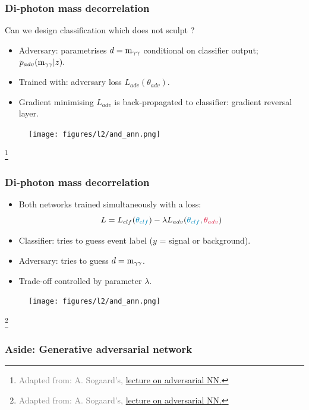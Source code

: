 \documentclass[11pt,xcolor=dvipsnames,aspectratio=169]{beamer}
\newcommand\blfootnote[1]{%
  \begingroup
  \renewcommand\thefootnote{}\footnote{\hspace{-30pt}\textcolor{Gray}{\tiny #1}}%
  \addtocounter{footnote}{-1}%
  \endgroup
}
\begin{document}
\begin{frame}
  \frametitle{\bf Di-photon mass decorrelation}
  Can we design classification which does not sculpt \myy{}?
  \begin{itemize}
  \item \textcolor{EDBRed}{Adversary}: parametrises $d=\mathrm{m}_{\gamma\gamma}{}$ conditional on classifier output; $p_{adv}(\mathrm{m}_{\gamma\gamma}{}|z).$
  \item Trained with: \textcolor{EDBRed}{adversary loss $L_{adv}(\theta_{adv})$}.
  \item Gradient minimising \textcolor{EDBRed}{$L_{adv}$} is back-propagated to
    \textcolor{EDBBlue}{classifier}: gradient reversal layer.
  \end{itemize}
  \begin{figure}
    \texttt{[image: figures/l2/and\_ann.png]}
  \end{figure}
  \blfootnote{Adapted from: A. Sogaard's,
    \href{https://github.com/asogaard/ep2mlf/blob/master/01-adversarial/2018-11-13_EP2MLF_AndreasSogaard.pdf}{lecture
    on adversarial NN.}}
\end{frame}


\begin{frame}
  \frametitle{\bf Di-photon mass decorrelation}
  \begin{itemize}
  \item Both networks trained simultaneously with a loss:
    $$ L = L_{clf}(\textcolor{EDBBlue}{\theta_{clf}})-\lambda L_{adv}(\textcolor{EDBBlue}{\theta_{clf}},\textcolor{EDBRed}{\theta_{adv}}) $$
  \item \textcolor{EDBBlue}{Classifier:} tries to guess event label ($y$ = signal or background).
  \item \textcolor{EDBRed}{Adversary:} tries to guess $d=\mathrm{m}_{\gamma\gamma}{}$.   
  \item Trade-off controlled by parameter $\lambda$.
  \end{itemize}
  \begin{figure}
    \texttt{[image: figures/l2/and\_ann.png]}
  \end{figure}
  \blfootnote{Adapted from: A. Sogaard's,
    \href{https://github.com/asogaard/ep2mlf/blob/master/01-adversarial/2018-11-13_EP2MLF_AndreasSogaard.pdf}{lecture
    on adversarial NN.}}
\end{frame}

{
%
\begin{frame}
  \frametitle{\bf Aside: Generative adversarial network}
\end{frame}
}
\end{document}
